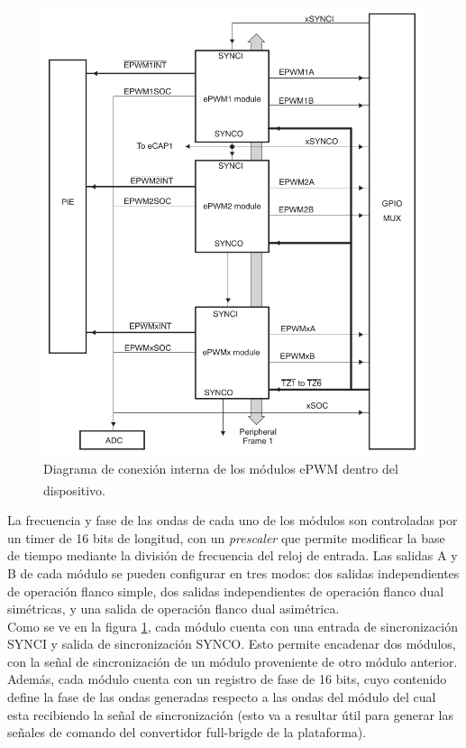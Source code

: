 \begin{figure}[h]
    \centering
    \includegraphics[scale=0.3]{Imagenes/Modulo ePWM.png}
    \caption{Diagrama de conexión interna de los módulos ePWM dentro del dispositivo.\textsuperscript{\cite{DSP-TechManual}}}
    \label{Modulo-ePWM}
\end{figure}

La frecuencia y fase de las ondas de cada uno de los módulos son controladas por un timer de 16 bits de longitud, con un \textit{prescaler} que permite modificar la base de tiempo mediante la división de frecuencia del reloj de entrada. Las salidas A y B de cada módulo se pueden configurar en tres modos: dos salidas independientes de operación flanco simple, dos salidas independientes de operación flanco dual simétricas, y una salida de operación flanco dual asimétrica.\\

Como se ve en la figura \ref{Modulo-ePWM}, cada módulo cuenta con una entrada de sincronización SYNCI y salida de sincronización SYNCO. Esto permite encadenar dos módulos, con la señal de sincronización de un módulo proveniente de otro módulo anterior. Además, cada módulo cuenta con un registro de fase de 16 bits, cuyo contenido define la fase de las ondas generadas respecto a las ondas del módulo del cual esta recibiendo la señal de sincronización (esto va a resultar útil para generar las señales de comando del convertidor full-brigde de la plataforma).\\

